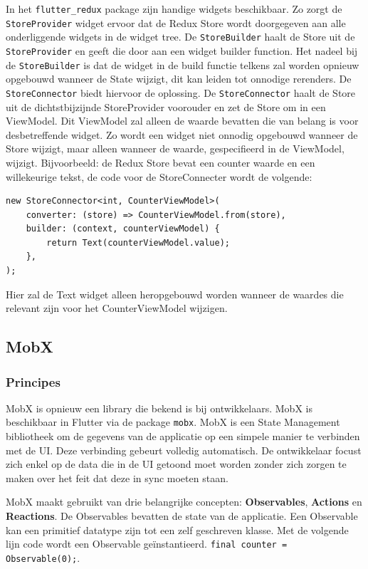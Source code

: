 In het \verb|flutter_redux| package zijn handige widgets beschikbaar. Zo zorgt de \verb|StoreProvider| widget ervoor dat de Redux Store wordt doorgegeven aan alle onderliggende widgets in de widget tree. De \verb|StoreBuilder| haalt de Store uit de \verb|StoreProvider| en geeft die door aan een widget builder function. Het nadeel bij de \verb|StoreBuilder| is dat de widget in de build functie telkens zal worden opnieuw opgebouwd wanneer de State wijzigt, dit kan leiden tot onnodige rerenders. De \verb|StoreConnector| biedt hiervoor de oplossing. De \verb|StoreConnector| haalt de Store uit de dichtstbijzijnde StoreProvider voorouder en zet de Store om in een ViewModel. Dit ViewModel zal alleen de waarde bevatten die van belang is voor desbetreffende widget. Zo wordt een widget niet onnodig opgebouwd wanneer de Store wijzigt, maar alleen wanneer de waarde, gespecifieerd in de ViewModel, wijzigt. Bijvoorbeeld: de Redux Store bevat een counter waarde en een willekeurige tekst, de code voor de StoreConnecter wordt de volgende: 

\begin{verbatim}
new StoreConnector<int, CounterViewModel>(
    converter: (store) => CounterViewModel.from(store),
    builder: (context, counterViewModel) {
        return Text(counterViewModel.value);
    },
);
\end{verbatim}
Hier zal de Text widget alleen heropgebouwd worden wanneer de waardes die relevant zijn voor het CounterViewModel wijzigen.


\subsection{MobX}
\label{ch:mobx}
\subsubsection{Principes}
MobX is opnieuw een library die bekend is bij ontwikkelaars. MobX is beschikbaar in Flutter via de package \verb|mobx|. MobX is een State Management bibliotheek om de gegevens van de applicatie op een simpele manier te verbinden met de UI. Deze verbinding gebeurt volledig automatisch. De ontwikkelaar focust zich enkel op de data die in de UI getoond moet worden zonder zich zorgen te maken over het feit dat deze in sync moeten staan.

MobX maakt gebruikt van drie belangrijke concepten: \textbf{Observables}, \textbf{Actions} en \textbf{Reactions}.
\newline
De Observables bevatten de state van de applicatie. Een Observable kan een primitief datatype zijn tot een zelf geschreven klasse. Met de volgende lijn code wordt een Observable geïnstantieerd. \verb|final counter = Observable(0);|.

